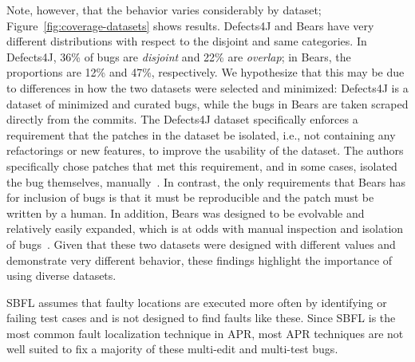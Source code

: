 
Note, however, that the behavior varies considerably by dataset;
Figure~\ref{fig:coverage-datasets} shows results.  Defects4J and 
Bears have very different distributions with respect to the 
disjoint and same categories. In Defects4J, 36\% of bugs are \emph{disjoint} and 
22\% are \emph{overlap}; in Bears, the proportions are 12\% and 47\%, respectively.
We hypothesize that this may be due to differences in how the two  
datasets were selected and minimized: Defects4J is a dataset of minimized and curated 
bugs, while the bugs in Bears are taken scraped directly from the
commits. The Defects4J dataset specifically enforces a requirement that the patches in the 
dataset be isolated, i.e., not containing any refactorings or new features, to improve the 
usability of the dataset. The authors specifically chose patches that met this requirement, 
and in some cases, isolated the bug themselves, manually~\cite{defects4j}. In contrast, the 
only requirements that Bears has for inclusion of bugs is that it must be reproducible and 
the patch must be written by a human. In addition, Bears was designed to be evolvable 
and relatively easily expanded, which is at odds with manual inspection and isolation of 
bugs~\cite{bears}.
Given that these two datasets were designed with different values and demonstrate very 
different behavior, these findings highlight the importance of using diverse datasets. 

  

SBFL assumes that faulty locations are executed more often by identifying 
or failing test cases and is not designed to find faults like these. Since SBFL 
is the most common fault localization technique in APR, most APR techniques 
are not well suited to fix a majority of these multi-edit and multi-test 
bugs.



%

